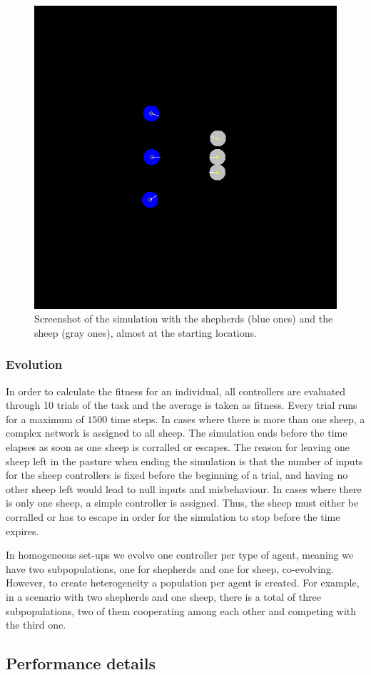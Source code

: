 \documentclass[conference]{IEEEtran}
\begin{document}
\begin{figure}[t]
	\centering
	\includegraphics[width=0.5\hsize]{imgs/pasture.png}
	\caption{Screenshot of the simulation with the shepherds (blue ones) and the sheep (gray ones), almost at the starting locations.}
	\label{fig:simulation_screenshot}
\end{figure}


\subsubsection{Evolution}
In order to calculate the fitness for an individual, all controllers are evaluated through 10 trials of the task and the average is taken as fitness.
Every trial runs for a maximum of $1500$ time steps. 
In cases where there is more than one sheep, a complex network is assigned to all sheep. 
The simulation ends before the time elapses as soon as one sheep is corralled or escapes. 
The reason for leaving one sheep left in the pasture when ending the simulation is that the number of inputs for the sheep controllers is fixed before the beginning of a trial, and having no other sheep left would lead to null inputs and misbehaviour. 
In cases where there is only one sheep, a simple controller is assigned. 
Thus, the sheep must either be corralled or has to escape in order for the simulation to stop before the time expires.

In homogeneous set-ups we evolve one controller per type of agent, meaning we have two subpopulations, one for shepherds and one for sheep, co-evolving. 
However, to create heterogeneity a population per agent is created. 
For example, in a scenario with two shepherds and one sheep, there is a total of three subpopulations, two of them cooperating among each other and competing with the third one.  



\subsection{Performance details}
\label{sec:experiments_performances}
\vspace{0.5em}
\end{document}
